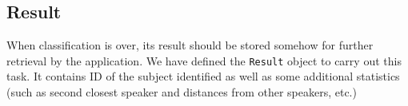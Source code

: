 \subsection{Result}

When classification is over, its result should be stored somehow
for further retrieval by the application. We have defined
the \verb+Result+ object to carry out this task. It contains
ID of the subject identified as well as some additional statistics
(such as second closest speaker and distances from other speakers, etc.)





